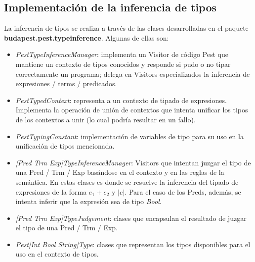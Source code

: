 \documentclass[a4paper]{article}
\begin{document}
\subsection{Implementación de la inferencia de tipos}

La inferencia de tipos se realiza a través de las clases desarrolladas en el paquete \textbf{budapest.pest.typeinference}. Algunas de ellas son:

\begin{itemize}
\item \emph{PestTypeInferenceManager}: implementa un Visitor de código Pest que mantiene un contexto de tipos conocidos y responde si pudo o no tipar correctamente un programa; delega en Visitors especializados la inferencia de expresiones / terms / predicados.
\item \emph{PestTypedContext}: representa a un contexto de tipado de expresiones.  Implementa la operación de unión de contextos que intenta unificar los tipos de los contextos a unir (lo cual podría resultar en un fallo).
\item \emph{PestTypingConstant}: implementación de variables de tipo para su uso en la unificación de tipos mencionada.
\item \emph{[Pred Trm Exp]TypeInferenceManager}: Visitors que intentan juzgar el tipo de una Pred / Trm / Exp basándose en el contexto y en las reglas de la semántica. En estas clases es donde se resuelve la inferencia del tipado de expresiones de la forma $e_1 + e_2$ y $|e|$. Para el caso de los Preds, además, se intenta inferir que la expresión sea de tipo \emph{Bool}. 
\item \emph{[Pred Trm Exp]TypeJudgement}: clases que encapsulan el resultado de juzgar el tipo de una Pred / Trm / Exp.
\item \emph{Pest[Int Bool String]Type}: clases que representan los tipos disponibles para el uso en el contexto de tipos.
\end{itemize}
\end{document}
